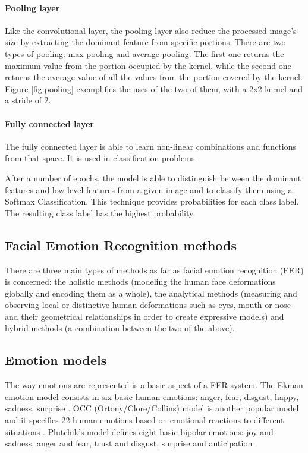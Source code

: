 \documentclass[runningheads,a4paper,12pt]{report}
\begin{document}
\paragraph{Pooling layer\\}
Like the convolutional layer, the pooling layer also reduce the processed image's size by extracting the dominant feature from specific portions. There are two types of pooling: max pooling and average pooling. The first one returns the maximum value from the portion occupied by the kernel, while the second one returns the average value of all the values from the portion covered by the kernel. Figure \ref{fig:pooling} exemplifies the uses of the two of them, with a 2x2 kernel and a stride of 2.

\paragraph{Fully connected layer\\}
The fully connected layer is able to learn non-linear combinations and functions from that space. It is used in classification problems. 

After a number of epochs, the model is able to distinguish between the dominant features and low-level features from a given image and to classify them using a Softmax Classification. This technique provides probabilities for each class label. The resulting class label has the highest probability.

\subsection{Facial Emotion Recognition methods}
There are three main types of methods as far as facial emotion recognition (FER) is concerned: the holistic methods (modeling the human face deformations globally and encoding them as a whole), the analytical methods (measuring and observing local or distinctive human deformations such as eyes, mouth or nose and their geometrical relationships in order to create expressive models) and hybrid methods (a combination between the two of the above)\cite{automatic-analysis-of-facial-expressions}. 

\subsection{Emotion models}
The way emotions are represented is a basic aspect of a FER system. The Ekman emotion model consists in six basic human emotions: anger, fear, disgust, happy, sadness, surprise \cite{basic-emotions}. OCC (Ortony/Clore/Collins) model is another popular model and it specifies 22 human emotions based on emotional reactions to different situations \cite{the-cognitive-structure-of-emotions}. Plutchik's model defines eight basic bipolar emotions: joy and sadness, anger and fear, trust and disgust, surprise and anticipation \cite{the-nature-of-emotions}.
\end{document}
